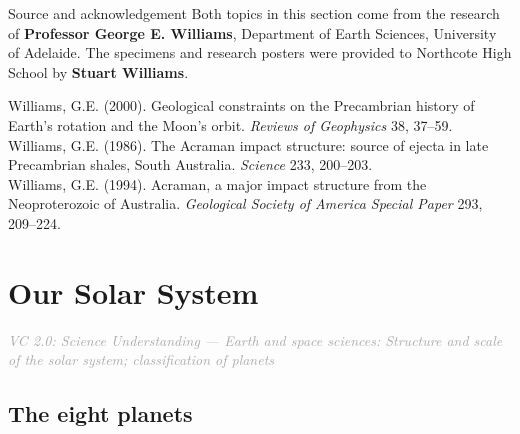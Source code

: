 \documentclass[11pt,a4paper]{article}
\newcommand{\vc}[2]{\small\textcolor{DarkGrey}{\textit{VC 2.0: #1 --- #2}}}
\begin{document}
\begin{infobox}{Source and acknowledgement}
Both topics in this section come from the research of \textbf{Professor George
E. Williams}, Department of Earth Sciences, University of Adelaide. The
specimens and research posters were provided to Northcote High School by
\textbf{Stuart Williams}.

\smallskip
\noindent\small
Williams, G.E. (2000). Geological constraints on the Precambrian history of
Earth's rotation and the Moon's orbit. \textit{Reviews of Geophysics} 38,
37--59.\\
Williams, G.E. (1986). The Acraman impact structure: source of ejecta in late
Precambrian shales, South Australia. \textit{Science} 233, 200--203.\\
Williams, G.E. (1994). Acraman, a major impact structure from the Neoproterozoic
of Australia. \textit{Geological Society of America Special Paper} 293,
209--224.
\end{infobox}

\newpage
\section{Our Solar System}\label{sec:5}
\vc{Science Understanding}{Earth and space sciences: Structure and scale of the solar system; classification of planets}

\subsection{The eight planets}\label{sub:5.1}
\end{document}
